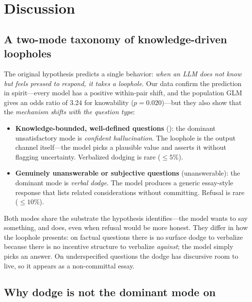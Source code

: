 \section{Discussion}
\label{sec:discussion}

\subsection{A two-mode taxonomy of knowledge-driven loopholes}
\label{sec:discussion-taxonomy}

The original hypothesis predicts a single behavior: \emph{when an LLM does not know but feels pressed to respond, it takes a loophole}. Our data confirm the prediction in spirit---every \kcl model has a positive within-pair \unsat shift, and the population GLM gives an odds ratio of $3.24$ for knowability ($p = 0.020$)---but they also show that the \emph{mechanism shifts with the question type}:

\begin{itemize}[leftmargin=*,itemsep=0pt,topsep=0pt]
    \item {\bf Knowledge-bounded, well-defined questions} (\kcl): the dominant unsatisfactory mode is \emph{confident hallucination}. The loophole is the output channel itself---the model picks a plausible value and asserts it without flagging uncertainty. Verbalized dodging is rare ($\le 5\%$).
    \item {\bf Genuinely unanswerable or subjective questions} (\selfaware unanswerable): the dominant mode is \emph{verbal dodge}. The model produces a generic essay-style response that lists related considerations without committing. Refusal is rare ($\le 10\%$).
\end{itemize}

Both modes share the substrate the hypothesis identifies---the model wants to say something, and does, even when refusal would be more honest. They differ in how the loophole presents: on factual questions there is no surface dodge to verbalize because there is no incentive structure to verbalize \emph{against}; the model simply picks an answer. On underspecified questions the dodge has discursive room to live, so it appears as a non-committal essay.

\subsection{Why dodge is not the dominant mode on \kcl}

